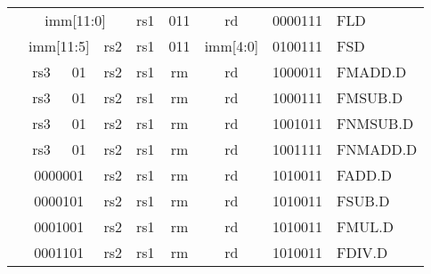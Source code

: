 \begin{table}[p]
\begin{small}
\begin{center}
\begin{tabular}{p{0in}p{0.4in}p{0.05in}p{0.05in}p{0.05in}p{0.05in}p{0.4in}p{0.6in}p{0.4in}p{0.6in}p{0.7in}l}
&
\multicolumn{6}{|c|}{imm[11:0]} &
\multicolumn{1}{c|}{rs1} &
\multicolumn{1}{c|}{011} &
\multicolumn{1}{c|}{rd} &
\multicolumn{1}{c|}{0000111} & FLD \\
\cline{2-11}


&
\multicolumn{4}{|c|}{imm[11:5]} &
\multicolumn{2}{c|}{rs2} &
\multicolumn{1}{c|}{rs1} &
\multicolumn{1}{c|}{011} &
\multicolumn{1}{c|}{imm[4:0]} &
\multicolumn{1}{c|}{0100111} & FSD \\
\cline{2-11}


&
\multicolumn{2}{|c|}{rs3} &
\multicolumn{2}{c|}{01} &
\multicolumn{2}{c|}{rs2} &
\multicolumn{1}{c|}{rs1} &
\multicolumn{1}{c|}{rm} &
\multicolumn{1}{c|}{rd} &
\multicolumn{1}{c|}{1000011} & FMADD.D \\
\cline{2-11}


&
\multicolumn{2}{|c|}{rs3} &
\multicolumn{2}{c|}{01} &
\multicolumn{2}{c|}{rs2} &
\multicolumn{1}{c|}{rs1} &
\multicolumn{1}{c|}{rm} &
\multicolumn{1}{c|}{rd} &
\multicolumn{1}{c|}{1000111} & FMSUB.D \\
\cline{2-11}


&
\multicolumn{2}{|c|}{rs3} &
\multicolumn{2}{c|}{01} &
\multicolumn{2}{c|}{rs2} &
\multicolumn{1}{c|}{rs1} &
\multicolumn{1}{c|}{rm} &
\multicolumn{1}{c|}{rd} &
\multicolumn{1}{c|}{1001011} & FNMSUB.D \\
\cline{2-11}


&
\multicolumn{2}{|c|}{rs3} &
\multicolumn{2}{c|}{01} &
\multicolumn{2}{c|}{rs2} &
\multicolumn{1}{c|}{rs1} &
\multicolumn{1}{c|}{rm} &
\multicolumn{1}{c|}{rd} &
\multicolumn{1}{c|}{1001111} & FNMADD.D \\
\cline{2-11}


&
\multicolumn{4}{|c|}{0000001} &
\multicolumn{2}{c|}{rs2} &
\multicolumn{1}{c|}{rs1} &
\multicolumn{1}{c|}{rm} &
\multicolumn{1}{c|}{rd} &
\multicolumn{1}{c|}{1010011} & FADD.D \\
\cline{2-11}


&
\multicolumn{4}{|c|}{0000101} &
\multicolumn{2}{c|}{rs2} &
\multicolumn{1}{c|}{rs1} &
\multicolumn{1}{c|}{rm} &
\multicolumn{1}{c|}{rd} &
\multicolumn{1}{c|}{1010011} & FSUB.D \\
\cline{2-11}


&
\multicolumn{4}{|c|}{0001001} &
\multicolumn{2}{c|}{rs2} &
\multicolumn{1}{c|}{rs1} &
\multicolumn{1}{c|}{rm} &
\multicolumn{1}{c|}{rd} &
\multicolumn{1}{c|}{1010011} & FMUL.D \\
\cline{2-11}


&
\multicolumn{4}{|c|}{0001101} &
\multicolumn{2}{c|}{rs2} &
\multicolumn{1}{c|}{rs1} &
\multicolumn{1}{c|}{rm} &
\multicolumn{1}{c|}{rd} &
\multicolumn{1}{c|}{1010011} & FDIV.D \\
\cline{2-11}



\end{tabular}
\end{center}
\end{small}
\end{table}
